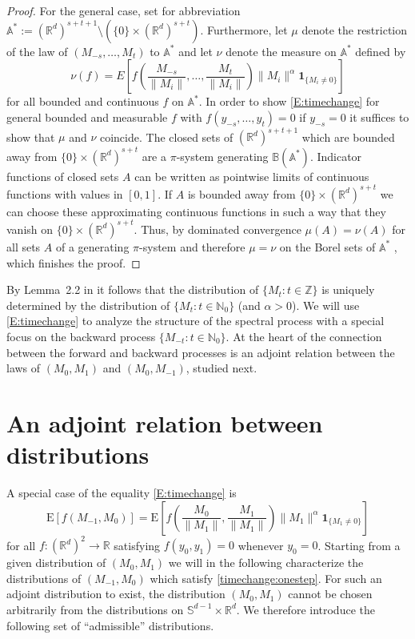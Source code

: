 \documentclass{aptpubarxiv}
\numberwithin{equation}{section}
\begin{document}
\begin{proof}
For the general case, set for abbreviation $\mathbb{A}^\ast:=(\mathbb{R}^d)^{s+t+1}\setminus(\{0\} \times (\mathbb{R}^d)^{s+t})$. Furthermore, let $\mu$ denote the restriction of the law of $(M_{-s}, \ldots, M_t)$ to $\mathbb{A}^\ast$ and let $\nu$ denote the measure on $\mathbb{A}^\ast$ defined by 
$$ \nu(f)=E\left[f\left(\frac{M_{-s}}{\|M_i\|}, \ldots, \frac{M_{t}}{\|M_i\|} \right) \|M_i\|^\alpha{\boldsymbol{1}}_{\{M_i \neq 0\}} \right] $$
for all bounded and continuous $f$ on $\mathbb{A}^\ast$. In order to show \eqref{E:timechange} for general bounded and measurable $f$ with $f(y_{-s}, \ldots, y_t)=0$ if $y_{-s}=0$ it suffices to show that $\mu$ and $\nu$ coincide. The closed sets of $(\mathbb{R}^d)^{s+t+1}$ which are bounded away from $\{0\} \times (\mathbb{R}^d)^{s+t}$ are a $\pi$-system generating $\mathbb{B}(\mathbb{A}^\ast)$. Indicator functions of closed sets $A$ can be written as pointwise limits of continuous functions with values in $[0,1]$. If $A$ is bounded away from $\{0\} \times (\mathbb{R}^d)^{s+t}$ we can choose these approximating continuous functions in such a way that they vanish on $\{0\} \times (\mathbb{R}^d)^{s+t}$. Thus, by dominated convergence $\mu(A)=\nu(A)$ for all sets $A$ of a generating $\pi$-system and therefore $\mu=\nu$ on the Borel sets of $\mathbb{A}^\ast$ \citep[][Theorem~2.2]{Bi68}, which finishes the proof.
\end{proof}

By Lemma~2.2 in \citet{BS09} it follows that the distribution of $\{M_t: t \in {\mathbb{Z}}\}$ is uniquely determined by the distribution of $\{M_t: t \in {\mathbb{N}}_0\}$ (and $\alpha>0$). We will use \eqref{E:timechange} to analyze the structure of the spectral process with a special focus on the backward process $\{M_ {-t}: t \in {\mathbb{N}}_0\}$. At the heart of the connection between the forward and backward processes is an adjoint relation between the laws of $(M_0,M_1)$ and $(M_0,M_{-1})$, studied next.

\section{An adjoint relation between distributions}
\label{S:adjoint}

A special case of the equality \eqref{E:timechange} is
\begin{equation}\label{timechange:onestep}
{\mathrm{E}}\left[f(M_{-1}, M_0)\right]= {\mathrm{E}}\left[f\left(\frac{M_0}{\|M_1\|}, \frac{M_1}{\|M_1\|} \right) \|M_1\|^\alpha{\boldsymbol{1}}_{\{M_1 \neq 0\}} \right]
\end{equation}
for all $f:(\mathbb{R}^d)^2 \to \mathbb{R}$ satisfying $f(y_0, y_1)=0$ whenever $y_0=0$. Starting from a given distribution of $(M_0, M_1)$ we will in the following characterize the distributions of $(M_{-1}, M_0)$ which satisfy \eqref{timechange:onestep}. 
For such an adjoint distribution to exist,
the distribution $(M_0, M_1)$ cannot be chosen arbitrarily from the distributions on $\mathbb{S}^{d-1}\times \mathbb{R}^d$. We therefore introduce the following set of ``admissible'' distributions.
\end{document}
